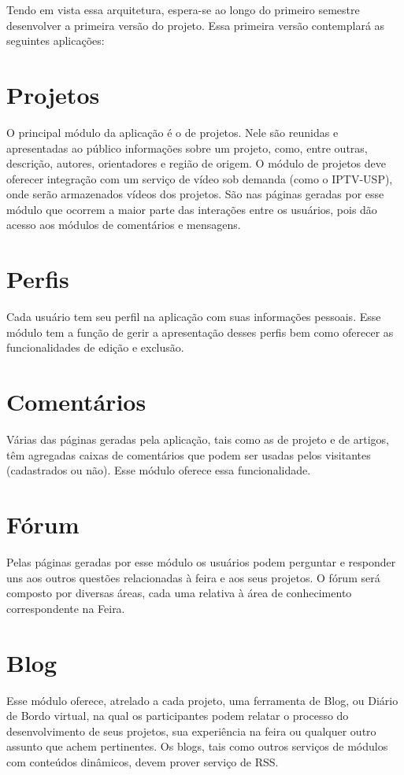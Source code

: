 \documentclass[a4paper,12pt,font=plain,header=plain]{abnt}
\begin{document}
    	Tendo em vista essa arquitetura, espera-se ao longo do primeiro semestre desenvolver a primeira versão do projeto. Essa primeira versão contemplará as seguintes aplicações:

		\section{Projetos}
		O principal módulo da aplicação é o de projetos. Nele são reunidas e apresentadas ao público informações sobre um projeto, como, entre outras, descrição, autores, orientadores e região de origem. O módulo de projetos deve oferecer integração com um serviço de vídeo sob demanda (como o IPTV-USP), onde serão armazenados vídeos dos projetos. São nas páginas geradas por esse módulo que ocorrem a maior parte das interações entre os usuários, pois dão acesso aos módulos de comentários e mensagens.

		\section{Perfis}
		Cada usuário tem seu perfil na aplicação com suas informações pessoais. Esse módulo tem a função de gerir a apresentação desses perfis bem como oferecer as funcionalidades de edição e exclusão.

		\section{Comentários}
		Várias das páginas geradas pela aplicação, tais como as de projeto e de artigos, têm agregadas caixas de comentários que podem ser usadas pelos visitantes (cadastrados ou não). Esse módulo oferece essa funcionalidade.

		\section{Fórum}
		Pelas páginas geradas por esse módulo os usuários podem perguntar e responder uns aos outros questões relacionadas à feira e aos seus projetos. O fórum será composto por diversas áreas, cada uma relativa à área de conhecimento correspondente na Feira.

		\section{Blog}
		Esse módulo oferece, atrelado a cada projeto, uma ferramenta de Blog, ou Diário de Bordo virtual, na qual os participantes podem relatar o processo do desenvolvimento de seus projetos, sua experiência na feira ou qualquer outro assunto que achem pertinentes. Os blogs, tais como outros serviços de módulos com conteúdos dinâmicos, devem prover serviço de RSS.
\end{document}

